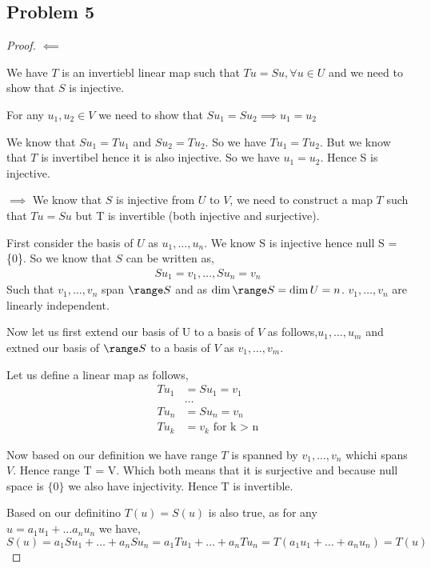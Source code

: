 \documentclass[a4paper]{report}
\begin{document}
\subsection*{Problem 5}
\begin{proof}
    $\impliedby$

    We have $T$ is an invertiebl linear map such that $Tu = Su, \forall u \in U$ and we need to show that $S$ is injective.

    For any $u_1,u_2 \in V$ we need to show that $Su_1 = Su_2 \implies u_1 = u_2$

    We know that $Su_1 = Tu_1$ and $Su_2 = Tu_2$. So we have $Tu_1 = Tu_2$. But we know that $T$ is invertibel hence it is also injective. So we have $u_1 = u_2$. Hence S is injective.


    $\implies$ 
    We know that $S$ is injective from $U$ to $V$, we need to construct a map $T$ such that $Tu = Su$ but T is invertible (both injective and surjective).

    First consider the basis of $U$ as $u_1,\dots,u_n$. We know S is injective hence null S =  \{0\}. So we know that $S $ can be written as, 
    \begin{align*}
        Su_1 = v_1,\dots,Su_n = v_n
    \end{align*}
    Such that $v_1,\dots,v_n$ span $\range S$ and as  $\dim \range S = \dim U = n$. $v_1,\dots,v_n$ are linearly independent.

    Now let us first extend our basis of U to a basis of $V$ as follows,$ u_1,\dots, u_m$ and extned our basis of $\range S$ to a basis of $V$ as $v_1,\dots,v_m$.

    Let us define a linear map as follows, 
    \begin{align*}
        Tu_1 &= Su_1 = v_1\\
             &\dots\\
        Tu_n &= Su_n = v_n\\
        Tu_{k}&= v_k \text{ for k >  n}
    \end{align*}

    Now based on our definition we have range $T$ is spanned by $v_1,\dots,v_n$ whichi spans $V$. Hence range T = V. Which both means that it is surjective and because null space is $\{0\}$ we also have injectivity. Hence T is invertible.

    Based on our definitino $T(u) = S(u)$ is also true, as for any $u = a_1u_1+ \dots a_nu_n$ we have, $S(u) =a_1Su_1 + \dots + a_nSu_n = a_1Tu_1+ \dots + a_nTu_n = T(a_1u_1+\dots + a_nu_n) = T(u)$
\end{proof}
\end{document}
